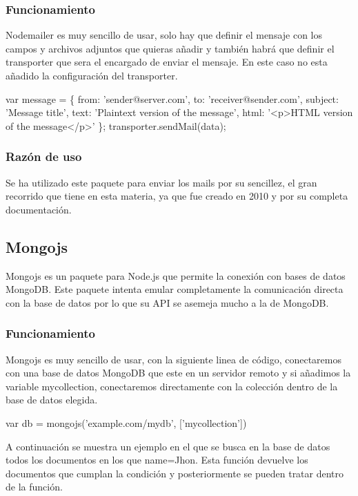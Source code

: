 \subsubsection{Funcionamiento}
Nodemailer es muy sencillo de usar, solo hay que definir el mensaje con los campos y archivos adjuntos que quieras añadir y también habrá que definir el transporter que sera el encargado de enviar el mensaje. En este caso no esta añadido la configuración del transporter.

\begin{codigo}
	var message = \{
		from: 'sender@server.com',
		to: 'receiver@sender.com',
		subject: 'Message title',
		text: 'Plaintext version of the message',
		html: '<p>HTML version of the message</p>'
	\};
	transporter.sendMail(data);
\end{codigo}

\subsubsection{Razón de uso}
Se ha utilizado este paquete para enviar los mails por su sencillez, el gran recorrido que tiene en esta materia, ya que fue creado en 2010 y por su completa documentación.

\subsection{Mongojs}
Mongojs es un paquete para Node.js que permite la conexión con bases de datos MongoDB. Este paquete intenta emular completamente la comunicación directa con la base de datos por lo que su API se asemeja mucho a la de MongoDB.

\subsubsection{Funcionamiento}
Mongojs es muy sencillo de usar, con la siguiente linea de código, conectaremos con una base de datos MongoDB que este en un servidor remoto y si añadimos la variable mycollection, conectaremos directamente con la colección dentro de la base de datos elegida. 

\begin{codigo}
	var db = mongojs('example.com/mydb', ['mycollection'])
\end{codigo}

A continuación se muestra un ejemplo en el que se busca en la base de datos todos los documentos en los que name=Jhon. Esta función devuelve los documentos que cumplan la condición y posteriormente se pueden tratar dentro de la función.

